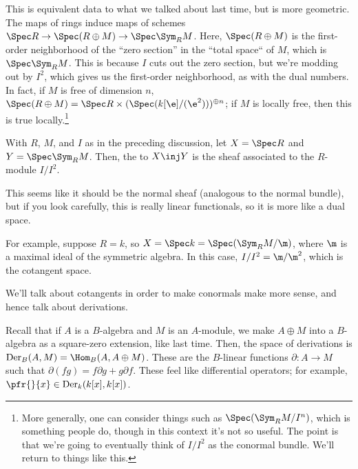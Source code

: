 This is equivalent data to what we talked about last time, but is more geometric. The maps of rings induce maps of
schemes \(\Spec R\to\Spec(R\oplus M)\to\Spec\Sym_R M\). Here, \(\Spec(R\oplus M)\) is the first-order neighborhood
of the ``zero section'' in the ``total space`` of \(M\), which is \(\Spec\Sym_R M\). This is because \(I\) cuts out
the zero section, but we're modding out by \(I^2\), which gives us the first-order neighborhood, as with the dual
numbers. In fact, if \(M\) is free of dimension \(n\), \(\Spec(R\oplus M) = \Spec R\times (\Spec
(k[\e]/(\e^2)))^{\oplus n}\); if \(M\) is locally free, then this is true locally.\footnote{More generally, one can
consider things such as \(\Spec(\Sym_R M/I^n)\), which is something people do, though in this context it's not so
useful. The point is that we're going to eventually think of \(I/I^2\) as the conormal bundle. We'll return to
things like this.}
\begin{defn}
With \(R\), \(M\), and \(I\) as in the preceding discussion, let \(X = \Spec R\) and \(Y = \Spec \Sym_R M\). Then,
the  to \(X\inj Y\) is the sheaf associated to the \(R\)-module \(I/I^2\).
\end{defn}
This seems like it should be the normal sheaf (analogous to the normal bundle), but if you look carefully, this is
really linear functionals, so it is more like a dual space.

For example, suppose \(R = k\), so \(X = \Spec k = \Spec(\Sym_R M/\m)\), where \(\m\) is a maximal ideal of the
symmetric algebra. In this case, \(I/I^2 = \m/\m^2\), which is the cotangent space.

We'll talk about cotangents in order to make conormals make more sense, and hence talk about derivations.

Recall that if \(A\) is a \(B\)-algebra and \(M\) is an \(A\)-module, we make \(A\oplus M\) into a \(B\)-algebra as
a square-zero extension, like last time. Then, the space of derivations is \(\Der_B(A,M) = \Hom_B(A,A\oplus M)\).
These are the \(B\)-linear functions \(\partial:A\to M\) such that \(\partial(fg) = f\partial g + g\partial f\).
These feel like differential operators; for example, \(\pfr{}{x}\in\Der_k(k[x],k[x])\).

